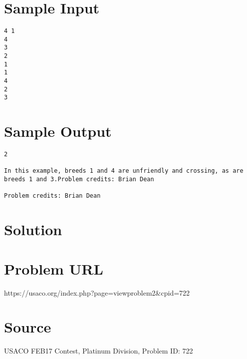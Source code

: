 \documentclass[12pt]{article}
\begin{document}
\section*{Sample Input}
\begin{verbatim}
4 1
4
3
2
1
1
4
2
3
\end{verbatim}

\section*{Sample Output}
\begin{verbatim}
2

In this example, breeds 1 and 4 are unfriendly and crossing, as are breeds 1 and 3.Problem credits: Brian Dean

Problem credits: Brian Dean
\end{verbatim}

\section*{Solution}


\section*{Problem URL}
https://usaco.org/index.php?page=viewproblem2&cpid=722

\section*{Source}
USACO FEB17 Contest, Platinum Division, Problem ID: 722
\end{document}

